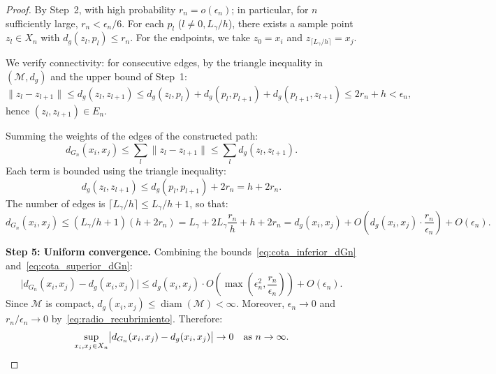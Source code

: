 \begin{proof}
	By Step~2, with high probability $r_n = o(\epsilon_n)$; in particular, for $n$ sufficiently large, $r_n < \epsilon_n/6$. For each $p_l$ ($l \neq 0, L_\gamma/h$), there exists a sample point $z_l \in X_n$ with $d_g(z_l, p_l) \leq r_n$. For the endpoints, we take $z_0 = x_i$ and $z_{\lceil L_\gamma/h \rceil} = x_j$.

	We verify connectivity: for consecutive edges, by the triangle inequality in $(\mathcal{M}, d_g)$ and the upper bound of Step~1:
	\[
	\|z_l - z_{l+1}\| \leq d_g(z_l, z_{l+1}) \leq d_g(z_l, p_l) + d_g(p_l, p_{l+1}) + d_g(p_{l+1}, z_{l+1}) \leq 2r_n + h < \epsilon_n,
	\]
	hence $(z_l, z_{l+1}) \in E_n$.

	Summing the weights of the edges of the constructed path:
	\[
	d_{G_n}(x_i, x_j) \leq \sum_l \|z_l - z_{l+1}\| \leq \sum_l d_g(z_l, z_{l+1}).
	\]
	Each term is bounded using the triangle inequality:
	\[
	d_g(z_l, z_{l+1}) \leq d_g(p_l, p_{l+1}) + 2r_n = h + 2r_n.
	\]
	The number of edges is $\lceil L_\gamma / h \rceil \leq L_\gamma/h + 1$, so that:
	\begin{equation}\label{eq:cota_superior_dGn}
	d_{G_n}(x_i, x_j) \leq (L_\gamma/h + 1)(h + 2r_n) = L_\gamma + 2L_\gamma \frac{r_n}{h} + h + 2r_n = d_g(x_i,x_j) + O\!\left(d_g(x_i,x_j) \cdot \frac{r_n}{\epsilon_n}\right) + O(\epsilon_n).
	\end{equation}

	\textbf{Step 5: Uniform convergence.}
	Combining the bounds~\eqref{eq:cota_inferior_dGn} and~\eqref{eq:cota_superior_dGn}:
	\[
	\bigl|d_{G_n}(x_i, x_j) - d_g(x_i, x_j)\bigr| \leq d_g(x_i, x_j) \cdot O\!\left(\max\!\left(\epsilon_n^2, \frac{r_n}{\epsilon_n}\right)\right) + O(\epsilon_n).
	\]
	Since $\mathcal{M}$ is compact, $d_g(x_i, x_j) \leq \operatorname{diam}(\mathcal{M}) < \infty$. Moreover, $\epsilon_n \to 0$ and $r_n/\epsilon_n \to 0$ by~\eqref{eq:radio_recubrimiento}. Therefore:
	\[
	\sup_{x_i, x_j \in X_n} \bigl|d_{G_n}(x_i, x_j) - d_g(x_i, x_j)\bigr| \to 0 \quad \text{as } n \to \infty. \qedhere
	\]
\end{proof}

